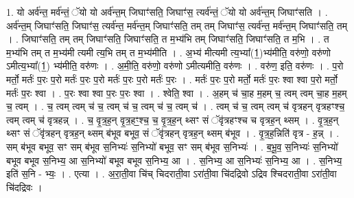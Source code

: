 \documentclass[17pt]{extarticle}
\begin{document}
1. यो अर्व॑न्त॒ मर्व॑न्तं॒ ॅयो यो अर्व॑न्त॒म् जिघाꣳ॑सति॒ जिघाꣳ॑स॒ त्यर्व॑न्तं॒ ॅयो यो अर्व॑न्त॒म् जिघाꣳ॑सति । . अर्व॑न्त॒म् जिघाꣳ॑सति॒ जिघाꣳ॑स॒ त्यर्व॑न्त॒ मर्व॑न्त॒म् जिघाꣳ॑सति॒ तम् तम् जिघाꣳ॑स॒ त्यर्व॑न्त॒ मर्व॑न्त॒म् जिघाꣳ॑सति॒ तम् । . जिघाꣳ॑सति॒ तम् तम् जिघाꣳ॑सति॒ जिघाꣳ॑सति॒ त म॒भ्य॑भि तम् जिघाꣳ॑सति॒ जिघाꣳ॑सति॒ त म॒भि । . त म॒भ्य॑भि तम् त म॒भ्य॑मी त्यमी त्य॒भि तम् त म॒भ्य॑मीति । . अ॒भ्य॑ मीत्यमी त्य॒भ्या᳚(1॒)भ्य॑मीति॒ वरु॑णो॒ वरु॑णो ऽमीत्य॒भ्या᳚(1॒) भ्य॑मीति॒ वरु॑णः । . अ॒मी॒ति॒ वरु॑णो॒ वरु॑णो ऽमीत्यमीति॒ वरु॑णः । . वरु॑ण॒ इति॒ वरु॑णः । . प॒रो मर्तो॒ मर्तः॑ प॒रः प॒रो मर्तः॑ प॒रः प॒रो मर्तः॑ प॒रः प॒रो मर्तः॑ प॒रः । . मर्तः॑ प॒रः प॒रो मर्तो॒ मर्तः॑ प॒रः श्वा श्वा प॒रो मर्तो॒ मर्तः॑ प॒रः श्वा । . प॒रः श्वा श्वा प॒रः प॒रः श्वा । . श्वेति॒ श्वा । . अ॒हम् च॑ चा॒ह म॒हम् च॒ त्वम् त्वम् चा॒ह म॒हम् च॒ त्वम् । . च॒ त्वम् त्वम् च॑ च॒ त्वम् च॑ च॒ त्वम् च॑ च॒ त्वम् च॑ । . त्वम् च॑ च॒ त्वम् त्वम् च॑ वृत्रहन् वृत्रहꣳश्च॒ त्वम् त्वम् च॑ वृत्रहन्न् । . च॒ वृ॒त्र॒ह॒न् वृ॒त्र॒हꣳ॒॒श्च॒ च॒ वृ॒त्र॒ह॒न् थ्सꣳ सं ॅवृ॑त्रहꣳश्च च वृत्रह॒न् थ्सम् । . वृ॒त्र॒ह॒न् थ्सꣳ सं ॅवृ॑त्रहन् वृत्रह॒न् थ्सम् ब॑भूव बभूव॒ सं ॅवृ॑त्रहन् वृत्रह॒न् थ्सम् ब॑भूव । . वृ॒त्र॒ह॒न्निति॑ वृत्र - ह॒न्न् । . सम् ब॑भूव बभूव॒ सꣳ सम् ब॑भूव स॒निभ्यः॑ स॒निभ्यो॑ बभूव॒ सꣳ सम् ब॑भूव स॒निभ्यः॑ । . ब॒भू॒व॒ स॒निभ्यः॑ स॒निभ्यो॑ बभूव बभूव स॒निभ्य॒ आ स॒निभ्यो॑ बभूव बभूव स॒निभ्य॒ आ । . स॒निभ्य॒ आ स॒निभ्यः॑ स॒निभ्य॒ आ । . स॒निभ्य॒ इति॑ स॒नि - भ्यः॒ । . एत्या । . अ॒रा॒ती॒वा चि॑च् चिदराती॒वा ऽरा॑ती॒वा चि॑दद्रिवो ऽद्रिव श्चिदराती॒वा ऽरा॑ती॒वा चि॑दद्रिवः । \newline
\end{document}
